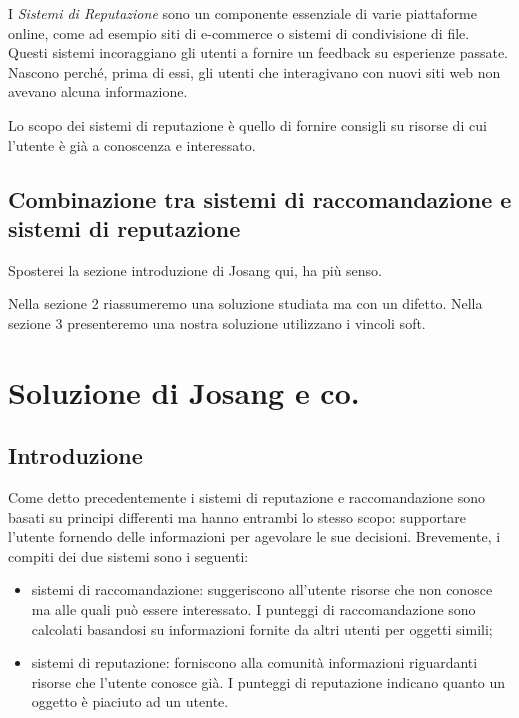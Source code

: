 \documentclass{report}
\begin{document}
	I \emph{Sistemi di Reputazione} sono un componente essenziale di varie
	piattaforme online, come ad esempio siti di e-commerce o sistemi di
	condivisione di file. Questi sistemi incoraggiano gli utenti a fornire
	un feedback su esperienze passate. Nascono perché, prima di essi, gli
	utenti che interagivano con nuovi siti web non avevano alcuna
	informazione.
	
	Lo scopo dei sistemi di reputazione è quello di fornire consigli su
	risorse di cui l'utente è già a conoscenza e interessato.
	
	\hypertarget{header-n20}{%
		\subsection{Combinazione tra sistemi di raccomandazione e sistemi di
			reputazione}\label{header-n20}}
	
	Sposterei la sezione introduzione di Josang qui, ha più senso.
	
	Nella sezione 2 riassumeremo una soluzione studiata ma con un difetto.
	Nella sezione 3 presenteremo una nostra soluzione utilizzano i vincoli
	soft.
	
	\hypertarget{header-n25}{%
		\section{Soluzione di Josang e co.}\label{header-n25}}
	
	\hypertarget{header-n26}{%
		\subsection{Introduzione}\label{header-n26}}
	
	Come detto precedentemente i sistemi di reputazione e raccomandazione
	sono basati su principi differenti ma hanno entrambi lo stesso scopo:
	supportare l'utente fornendo delle informazioni per agevolare le sue
	decisioni. Brevemente, i compiti dei due sistemi sono i seguenti:
	
	\begin{itemize}
		\item
		sistemi di raccomandazione: suggeriscono all'utente risorse che non
		conosce ma alle quali può essere interessato. I punteggi di
		raccomandazione sono calcolati basandosi su informazioni fornite da
		altri utenti per oggetti simili;
		\item
		sistemi di reputazione: forniscono alla comunità informazioni
		riguardanti risorse che l'utente conosce già. I punteggi di
		reputazione indicano quanto un oggetto è piaciuto ad un utente.
	\end{itemize}
	
\end{document}
